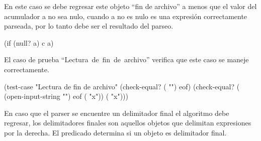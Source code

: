 \documentclass[letterpaper, twoside, openright, 11pt]{book}%
\begin{document}
En este caso se debe regresar este objeto ``fin de archivo'' a menos que el valor del acumulador {\Tt{}a\nwendquote} no sea nulo, cuando {\Tt{}a\nwendquote} no es nulo es una expresión correctamente parseada, por lo tanto debe ser el resultado del parseo.

\nwenddocs{}\endmoddef\nwstartdeflinemarkup{}\nwenddeflinemarkup
(if (null? a) c a)
\nwendcode{}\nwdocspar

El caso de prueba ``{\Tt{}Lectura\ de\ fin\ de\ archivo\nwendquote}'' verifica que este caso se maneje correctamente.

\nwenddocs{}\plusendmoddef\nwstartdeflinemarkup{}\nwenddeflinemarkup
(test-case "Lectura de fin de archivo"
  (check-equal? ( "") eof)
  (check-equal? ( (open-input-string "") eof ( "x"))
                ( "x")))
\nwendcode{}\nwdocspar

En caso que el parser se encuentre un delimitador final el algoritmo debe regresar, los delimitadores finales son aquellos objetos que delimitan expresiones por la derecha. El predicado {\Tt{}\nwendquote} determina si un objeto es delimitador final.
\end{document}
